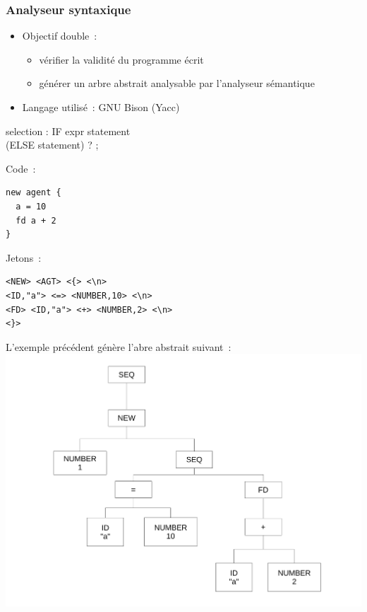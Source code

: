 \begin{frame}
	\frametitle{Analyseur syntaxique}
	\begin{itemize}
	\item Objectif double~: 
		\begin{itemize}
		\item vérifier la validité du programme écrit
		\item générer un arbre abstrait analysable par l'analyseur sémantique
		\end{itemize}
	\item Langage utilisé~: GNU Bison (Yacc)
	\end{itemize}
\end{frame}

\begin{frame}[fragile]
	\begin{rail}
		selection : IF expr statement \\ (ELSE statement) ? ;
	\end{rail}
\end{frame}

\begin{frame}[fragile]
	Code~:
	\begin{lstlisting}[language=Stibbons]
new agent {
  a = 10
  fd a + 2
}
	\end{lstlisting}
	Jetons~:
	\begin{lstlisting}[breaklines]
<NEW> <AGT> <{> <\n> 
<ID,"a"> <=> <NUMBER,10> <\n>
<FD> <ID,"a"> <+> <NUMBER,2> <\n>
<}>
	\end{lstlisting}
\end{frame}

\begin{frame}
L'exemple précédent génère l'abre abstrait suivant~:
\includegraphics[scale=0.3]{doc/Presentation/img/arbre.pdf}
\end{frame}
